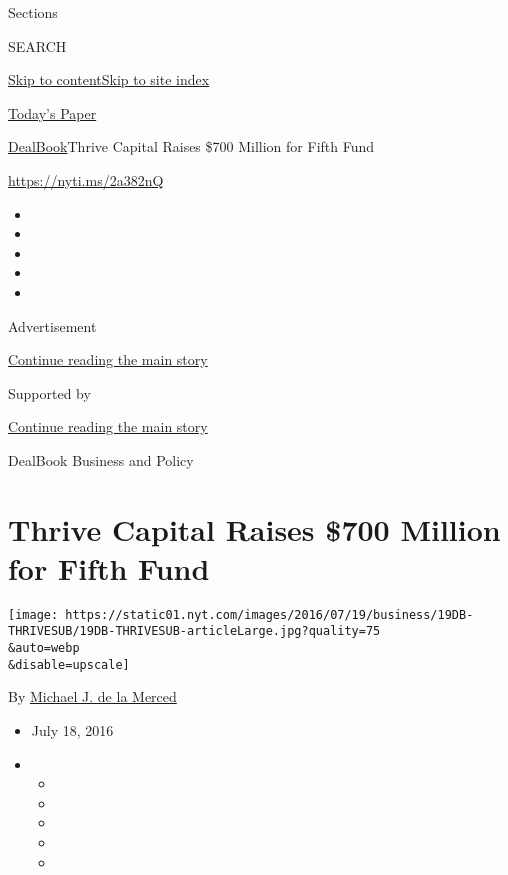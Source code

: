 Sections

SEARCH

\protect\hyperlink{site-content}{Skip to
content}\protect\hyperlink{site-index}{Skip to site index}

\href{https://myaccount.nytimes.com/auth/login?response_type=cookie\&client_id=vi}{}

\href{https://www.nytimes.com/section/todayspaper}{Today's Paper}

\href{/section/business/dealbook}{DealBook}\textbar{}Thrive Capital
Raises \$700 Million for Fifth Fund

\url{https://nyti.ms/2a382nQ}

\begin{itemize}
\item
\item
\item
\item
\item
\end{itemize}

Advertisement

\protect\hyperlink{after-top}{Continue reading the main story}

Supported by

\protect\hyperlink{after-sponsor}{Continue reading the main story}

DealBook Business and Policy

\hypertarget{thrive-capital-raises-700-million-for-fifth-fund}{%
\section{Thrive Capital Raises \$700 Million for Fifth
Fund}\label{thrive-capital-raises-700-million-for-fifth-fund}}

\texttt{[image: https://static01.nyt.com/images/2016/07/19/business/19DB-THRIVESUB/19DB-THRIVESUB-articleLarge.jpg?quality=75\\\&auto=webp\\\&disable=upscale]}

By \href{http://www.nytimes.com/by/michael-j-de-la-merced}{Michael J. de
la Merced}

\begin{itemize}
\item
  July 18, 2016
\item
  \begin{itemize}
  \item
  \item
  \item
  \item
  \item
  \end{itemize}
\end{itemize}

